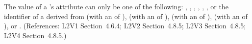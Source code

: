 The value of a \Species's  attribute can only be one of
the following: , , , ,
, , or the identifier of a
\UnitDefinition derived from  (with an  of
),  (with an  of ), 
(with an  of ),  (with an
 of ), or .  (References: L2V1
Section~4.6.4; L2V2 Section~4.8.5; L2V3 Section~4.8.5; L2V4 Section~4.8.5.)
